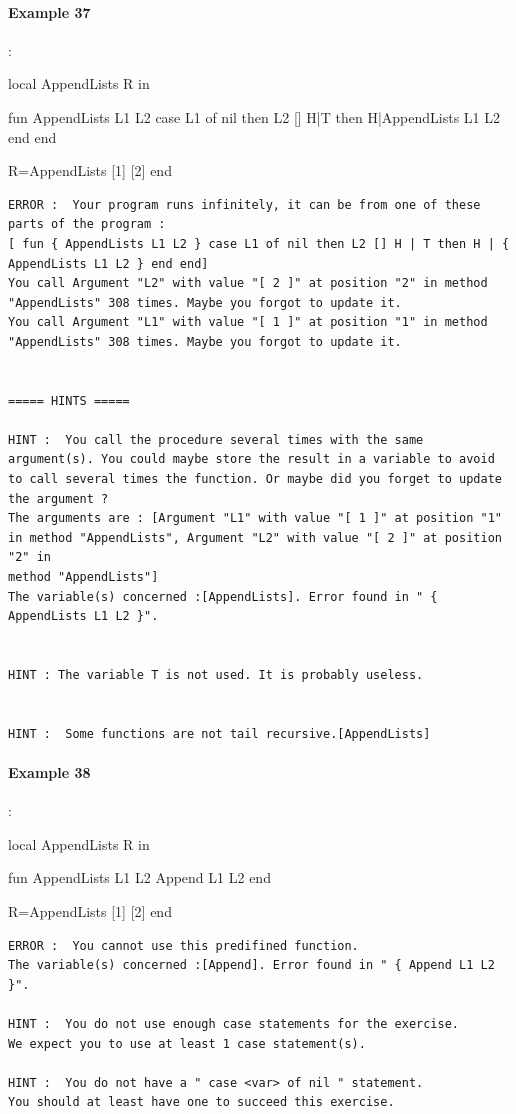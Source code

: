 \documentclass[11pt,a4paper,twoside,openright]{report}
\begin{document}
\paragraph{Example 37}:

\begin{OZ}
local AppendLists R in

	fun {AppendLists L1 L2}
		case L1 of nil then L2
		[] H|T then H|{AppendLists L1 L2}
		end
	end

R={AppendLists [1] [2]}
end
\end{OZ}

\begin{lstlisting}
ERROR :  Your program runs infinitely, it can be from one of these parts of the program : 
[ fun { AppendLists L1 L2 } case L1 of nil then L2 [] H | T then H | { AppendLists L1 L2 } end end]
You call Argument "L2" with value "[ 2 ]" at position "2" in method "AppendLists" 308 times. Maybe you forgot to update it.
You call Argument "L1" with value "[ 1 ]" at position "1" in method "AppendLists" 308 times. Maybe you forgot to update it.


===== HINTS =====

HINT :  You call the procedure several times with the same argument(s). You could maybe store the result in a variable to avoid to call several times the function. Or maybe did you forget to update the argument ? 
The arguments are : [Argument "L1" with value "[ 1 ]" at position "1" in method "AppendLists", Argument "L2" with value "[ 2 ]" at position "2" in 
method "AppendLists"]
The variable(s) concerned :[AppendLists]. Error found in " { AppendLists L1 L2 }".


HINT : The variable T is not used. It is probably useless.


HINT :  Some functions are not tail recursive.[AppendLists]

\end{lstlisting}


\paragraph{Example 38}:

\begin{OZ}
local AppendLists R in

	fun {AppendLists L1 L2}
		{Append L1 L2}
	end

R={AppendLists [1] [2]}
end
\end{OZ}

\begin{lstlisting}
ERROR :  You cannot use this predifined function. 
The variable(s) concerned :[Append]. Error found in " { Append L1 L2 }".

HINT :  You do not use enough case statements for the exercise. 
We expect you to use at least 1 case statement(s).

HINT :  You do not have a " case <var> of nil " statement. 
You should at least have one to succeed this exercise.
\end{lstlisting}
\end{document}
